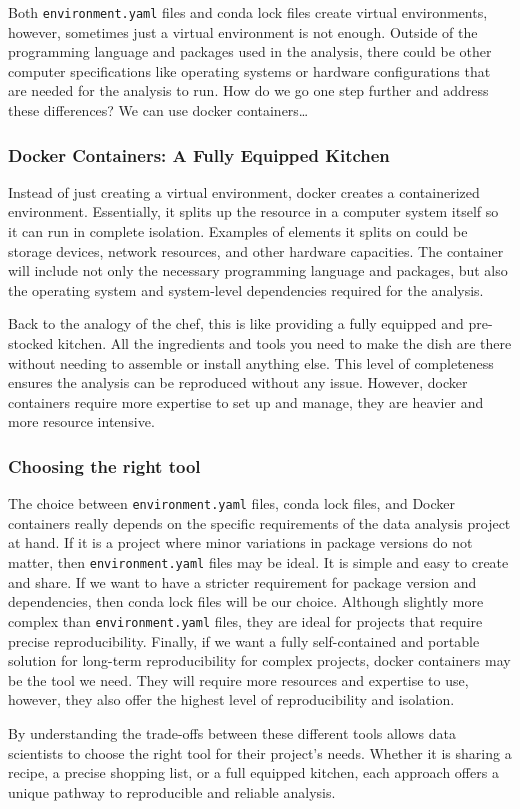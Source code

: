 \documentclass[
  letterpaper,
  DIV=11,
  numbers=noendperiod]{scrartcl}
\begin{document}
Both \texttt{environment.yaml} files and conda lock files create virtual
environments, however, sometimes just a virtual environment is not
enough. Outside of the programming language and packages used in the
analysis, there could be other computer specifications like operating
systems or hardware configurations that are needed for the analysis to
run. How do we go one step further and address these differences? We can
use docker containers\ldots{}

\subsubsection{Docker Containers: A Fully Equipped
Kitchen}\label{docker-containers-a-fully-equipped-kitchen}

Instead of just creating a virtual environment, docker creates a
containerized environment. Essentially, it splits up the resource in a
computer system itself so it can run in complete isolation. Examples of
elements it splits on could be storage devices, network resources, and
other hardware capacities. The container will include not only the
necessary programming language and packages, but also the operating
system and system-level dependencies required for the analysis.

Back to the analogy of the chef, this is like providing a fully equipped
and pre-stocked kitchen. All the ingredients and tools you need to make
the dish are there without needing to assemble or install anything else.
This level of completeness ensures the analysis can be reproduced
without any issue. However, docker containers require more expertise to
set up and manage, they are heavier and more resource intensive.

\subsubsection{Choosing the right tool}\label{choosing-the-right-tool}

The choice between \texttt{environment.yaml} files, conda lock files,
and Docker containers really depends on the specific requirements of the
data analysis project at hand. If it is a project where minor variations
in package versions do not matter, then \texttt{environment.yaml} files
may be ideal. It is simple and easy to create and share. If we want to
have a stricter requirement for package version and dependencies, then
conda lock files will be our choice. Although slightly more complex than
\texttt{environment.yaml} files, they are ideal for projects that
require precise reproducibility. Finally, if we want a fully
self-contained and portable solution for long-term reproducibility for
complex projects, docker containers may be the tool we need. They will
require more resources and expertise to use, however, they also offer
the highest level of reproducibility and isolation.

By understanding the trade-offs between these different tools allows
data scientists to choose the right tool for their project's needs.
Whether it is sharing a recipe, a precise shopping list, or a full
equipped kitchen, each approach offers a unique pathway to reproducible
and reliable analysis.
\end{document}
